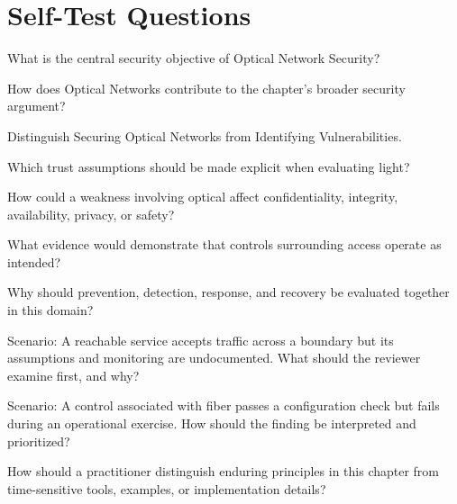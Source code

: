 \documentclass[11pt,letterpaper]{article}
\begin{document}
\section*{Self-Test Questions}
\begin{CornellRecallList}
\item What is the central security objective of Optical Network Security?
\item How does Optical Networks contribute to the chapter's broader security argument?
\item Distinguish Securing Optical Networks from Identifying Vulnerabilities.
\item Which trust assumptions should be made explicit when evaluating light?
\item How could a weakness involving optical affect confidentiality, integrity, availability, privacy, or safety?
\item What evidence would demonstrate that controls surrounding access operate as intended?
\item Why should prevention, detection, response, and recovery be evaluated together in this domain?
\item Scenario: A reachable service accepts traffic across a boundary but its assumptions and monitoring are undocumented. What should the reviewer examine first, and why?
\item Scenario: A control associated with fiber passes a configuration check but fails during an operational exercise. How should the finding be interpreted and prioritized?
\item How should a practitioner distinguish enduring principles in this chapter from time-sensitive tools, examples, or implementation details?
\end{CornellRecallList}
\end{document}
